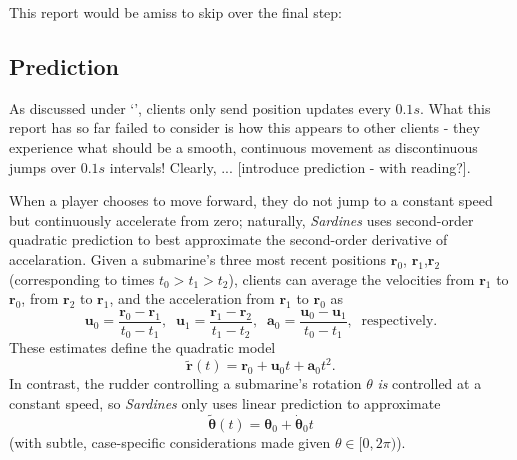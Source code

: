 \documentclass[a4paper, 10pt]{article}
\begin{document}
\begin{flushleft}
\vspace{5pt}\noindent
This report would be amiss to skip over the final step: 

\subsection*{Prediction}\label{Prediction}

As discussed under `',  clients only send position updates every $0.1s$. What this report has so far failed to consider is how this appears to other clients - they experience what should be a smooth, continuous movement as discontinuous jumps over $0.1s$ intervals! Clearly, ... [introduce prediction - with reading?].

\vspace{5pt}\noindent
When a player chooses to move forward, they do not jump to a constant speed but continuously accelerate from zero; naturally, \textit{Sardines} uses second-order quadratic prediction to best approximate the second-order derivative of accelaration. Given a submarine's three most recent positions $\mathbf{r}_0$, $\mathbf{r}_1$,$\mathbf{r}_2$ (corresponding to times $t_0 > t_1 > t_2$), clients can average the velocities from $\mathbf{r}_1$ to $\mathbf{r}_0$, from $\mathbf{r}_2$ to $\mathbf{r}_1$, and the acceleration from $\mathbf{r}_1$ to $\mathbf{r}_0$ as
$$\mathbf{u}_0 = \frac{\mathbf{r}_0-\mathbf{r}_1}{t_0-t_1}, \;\; \mathbf{u}_1 = \frac{\mathbf{r}_1-\mathbf{r}_2}{t_1-t_2}, \;\; \mathbf{a}_0 = \frac{\mathbf{u}_0-\mathbf{u}_1}{t_0-t_1}, \;\; \textrm{respectively.}$$
These estimates define the quadratic model
$$ \mathbf{\tilde{r}}(t) = \mathbf{r}_0+\mathbf{u}_0t+\mathbf{a}_0t^2.$$
In contrast, the rudder controlling a submarine's rotation $\theta$ \textit{is} controlled at a constant speed, so \textit{Sardines} only uses linear prediction to approximate
$$\mathbf{\tilde{\theta}}(t) = \mathbf{\theta}_0+\mathbf{\dot{\theta}}_0t$$
(with subtle, case-specific considerations made given $\theta \in [0,2\pi)$).



\end{flushleft}
\end{document}
